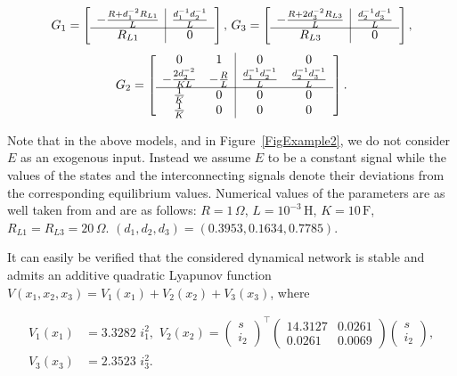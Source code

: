 \documentclass[11pt,a4paper,oneside,DIV=12,headings=small]{scrartcl}
\theoremstyle{plain}
\begin{document}
\begin{equation}
G_1=\left[\begin{array}{c | c} -\frac{R+d_1^{-2}R_{L1}}{L} & \frac{d_1^{-1}d_2^{-1}}{L} \\ \hline R_{L1} & 0 \end{array} \right],\, G_3=\left[\begin{array}{c | c} -\frac{R+2d_3^{-2}R_{L3}}{L} & \frac{d_2^{-1}d_3^{-1}}{L} \\ \hline R_{L3} & 0 \end{array} \right], \nonumber
\end{equation}
\begin{equation}
G_2=\left[\begin{array}{c c | c c} 0 & 1 & 0 & 0 \\ 
-\frac{2d_2^{-2}}{KL} & -\frac{R}{L} & \frac{d_1^{-1}d_2^{-1}}{L} & \frac{d_2^{-1}d_3^{-1}}{L}\\ \hline 
\frac{1}{K} & 0 & 0 & 0 \\ 
\frac{1}{K} & 0 & 0 & 0  \end{array} \right]. \nonumber
\end{equation}

Note that in the above models, and in Figure~\ref{FigExample2}, we do not consider $E$ as an exogenous input. Instead we assume $E$ to be a constant signal while the values of the states and the interconnecting signals denote their deviations from  the corresponding equilibrium values. Numerical values of the parameters are as well taken from \cite{Ebihara} and are as follows: $R=1\, \Omega$, $L = 10^{-3}\, \text{H}$, $K=10\, \text{F}$, $R_{L1}=R_{L3}=20\, \Omega$. $(d_1,d_2,d_3)=(0.3953, 0.1634, 0.7785)$.

It can easily be verified that the considered dynamical network is stable and admits an additive quadratic Lyapunov function $V(x_1,x_2,x_3)=V_1(x_1)+V_2(x_2)+V_3(x_3)$, where 

\begin{align}
V_1(x_1)&=3.3282\,\, i_1^2, \,\,
V_2(x_2)=\begin{pmatrix} s \\ i_2 \end{pmatrix}^\top
\begin{pmatrix} 14.3127 & 0.0261 \\ 0.0261 & 0.0069 \end{pmatrix}
\begin{pmatrix} s \\ i_2 \end{pmatrix}, \nonumber \\
V_3(x_3)&=2.3523\,\, i_3^2. \nonumber
\end{align}
\end{document}
